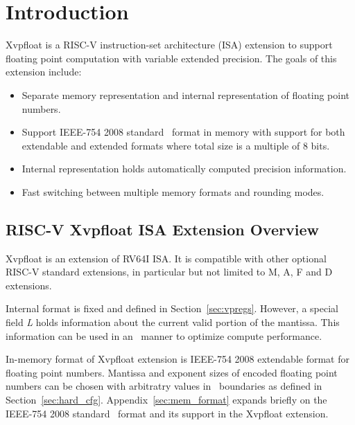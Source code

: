 \chapter{Introduction}

Xvpfloat is a RISC-V instruction-set architecture (ISA) extension to support floating point computation with variable extended precision.
The goals of this extension include:
\vspace{-0.1in}
\begin{itemize}
\parskip 0pt
\itemsep 1pt
\item Separate memory representation and internal representation of floating point numbers.
\item Support IEEE-754 2008 standard~\cite{ieee754-2008} format in memory with support for both extendable and extended formats where total size is a multiple of 8 bits.
\item Internal representation holds automatically computed precision information.
\item Fast switching between multiple memory formats and rounding modes.
\end{itemize}
\vspace{-0.1in}


\section{RISC-V Xvpfloat ISA Extension Overview}

Xvpfloat is an extension of RV64I ISA.
It is compatible with other optional RISC-V standard extensions, in particular but not limited to M, A, F and D extensions.

Internal format is fixed and defined in Section~\ref{sec:vpregs}.
However, a special field {\em L} holds information about the current valid portion of the mantissa.
This information can be used in an \implementationdefined\ manner to optimize compute performance.

In-memory format of Xvpfloat extension is IEEE-754 2008 extendable format for floating point numbers.
Mantissa and exponent sizes of encoded floating point numbers can be chosen with arbitratry values in \implementationdefined\ boundaries as defined in Section~\ref{sec:hard_cfg}. 
Appendix~\ref{sec:mem_format} expands briefly on the IEEE-754 2008 standard~\cite{ieee754-2008} format and its support in the Xvpfloat extension.

